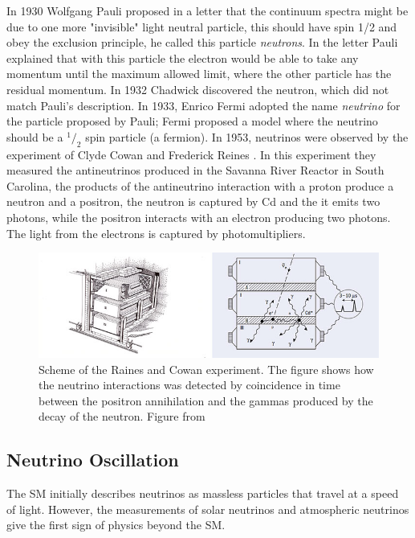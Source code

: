 In 1930 Wolfgang Pauli \cite{NeutrinoHistory} proposed in a letter that the continuum spectra might be due to one more "invisible" light neutral particle, this should have spin 1/2 and obey the exclusion principle, he called this particle \textit{neutrons}. In the letter Pauli explained that with this particle the electron would be able to take any momentum until the maximum allowed limit, where the other particle has the residual momentum. In 1932 Chadwick discovered the neutron, which did not match Pauli's description. In 1933, Enrico Fermi adopted the name \textit{neutrino} for the particle proposed by Pauli; Fermi proposed a model where the neutrino should be a $^1/_2$ spin particle (a fermion). In 1953, neutrinos were observed by the experiment of Clyde Cowan and Frederick Reines \cite{CowanReinesdoi:10.1126/science.124.3212.103}\cite{ReinesCowanPhysRev.92.830}. In this experiment they measured the antineutrinos produced in the Savanna River Reactor in South Carolina, the products of the antineutrino interaction with a proton produce a neutron and a positron, the neutron is captured by Cd and the it emits two photons, while the positron interacts with an electron producing two photons. The light from the electrons is captured by photomultipliers.

\begin{figure}
    \centering
    \includegraphics[scale=0.5]{Figures/Chapter1/RainesCowanExperiment.jpg}
    \caption{Scheme of the Raines and Cowan experiment. The figure shows how the neutrino interactions was detected by coincidence in time between the positron annihilation and the gammas produced by the decay of the neutron. Figure from \cite{ReinesCowanScheme}}
    \label{fig:RainesCowanExperiment}
\end{figure}

\subsection{Neutrino Oscillation}
\label{Cap:Int:NuOscillation}

The SM initially describes neutrinos as massless particles that travel at a speed of light. However, the measurements of solar neutrinos and atmospheric neutrinos give the first sign of physics beyond the SM.

